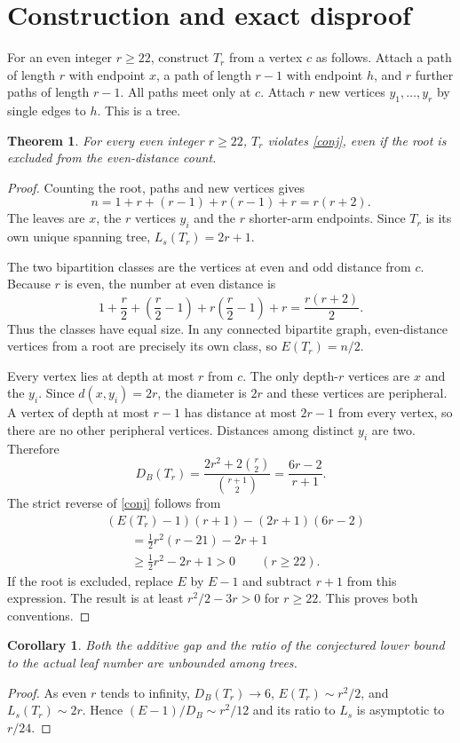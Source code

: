 \documentclass[11pt]{article}
\newtheorem{theorem}{Theorem}
\newtheorem{corollary}{Corollary}
\begin{document}
\section{Construction and exact disproof}
For an even integer $r\ge22$, construct $T_r$ from a vertex $c$ as follows. Attach a path of length $r$ with endpoint $x$, a path of length $r-1$ with endpoint $h$, and $r$ further paths of length $r-1$. All paths meet only at $c$. Attach $r$ new vertices $y_1,\ldots,y_r$ by single edges to $h$. This is a tree.
\begin{theorem}
For every even integer $r\ge22$, $T_r$ violates \eqref{conj}, even if the root is excluded from the even-distance count.
\end{theorem}
\begin{proof}
Counting the root, paths and new vertices gives
\[
 n=1+r+(r-1)+r(r-1)+r=r(r+2).
\]
The leaves are $x$, the $r$ vertices $y_i$ and the $r$ shorter-arm endpoints. Since $T_r$ is its own unique spanning tree, $L_s(T_r)=2r+1$.

The two bipartition classes are the vertices at even and odd distance from $c$. Because $r$ is even, the number at even distance is
\[
 1+\frac r2+\left(\frac r2-1\right)
 +r\left(\frac r2-1\right)+r=\frac{r(r+2)}2.
\]
Thus the classes have equal size. In any connected bipartite graph, even-distance vertices from a root are precisely its own class, so $E(T_r)=n/2$.

Every vertex lies at depth at most $r$ from $c$. The only depth-$r$ vertices are $x$ and the $y_i$. Since $d(x,y_i)=2r$, the diameter is $2r$ and these vertices are peripheral. A vertex of depth at most $r-1$ has distance at most $2r-1$ from every vertex, so there are no other peripheral vertices. Distances among distinct $y_i$ are two. Therefore
\[
 D_B(T_r)=\frac{2r^2+2\binom r2}{\binom{r+1}2}
 =\frac{6r-2}{r+1}.
\]
The strict reverse of \eqref{conj} follows from
\begin{align*}
 &(E(T_r)-1)(r+1)-(2r+1)(6r-2)\\
 &\qquad=\tfrac12 r^2(r-21)-2r+1\\
 &\qquad\ge \tfrac12r^2-2r+1>0
 \qquad(r\ge22).
\end{align*}
If the root is excluded, replace $E$ by $E-1$ and subtract $r+1$ from this expression. The result is at least $r^2/2-3r>0$ for $r\ge22$. This proves both conventions.
\end{proof}
\begin{corollary}
Both the additive gap and the ratio of the conjectured lower bound to the actual leaf number are unbounded among trees.
\end{corollary}
\begin{proof}
As even $r$ tends to infinity, $D_B(T_r)\to6$, $E(T_r)\sim r^2/2$, and $L_s(T_r)\sim2r$. Hence $(E-1)/D_B\sim r^2/12$ and its ratio to $L_s$ is asymptotic to $r/24$.
\end{proof}
\end{document}
